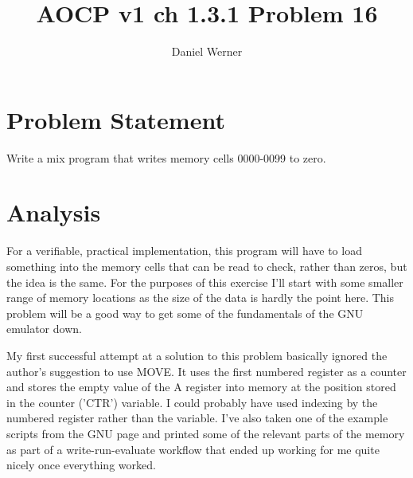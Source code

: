 \documentclass{article}
\title{AOCP v1 ch 1.3.1 Problem 16}
\author{Daniel Werner}
\begin{document}
\maketitle

\section*{
    Problem Statement
}

Write a mix program that writes memory cells 0000-0099 to zero.

\section*{
    Analysis
}

For a verifiable, practical implementation, this program
 will have to load something into the memory cells that 
 can be read to check, rather than zeros, but the idea is
 the same.  For the purposes of this exercise I'll start
 with some smaller range of memory locations as the size
 of the data is hardly the point here.  This problem will 
 be a good way to get some of the fundamentals of the GNU emulator down.

\par

My first successful attempt at a solution to this problem
basically ignored the author's suggestion to use MOVE.
It uses the first numbered register as a counter and stores
the empty value of the A register into memory at the
position stored in the counter ('CTR') variable.  I could
probably have used indexing by the numbered register rather
than the variable.  I've also taken one of the example
scripts from the GNU page and printed some of the relevant
parts of the memory as part of a write-run-evaluate workflow
that ended up working for me quite nicely once everything
worked.

\par
\end{document}
